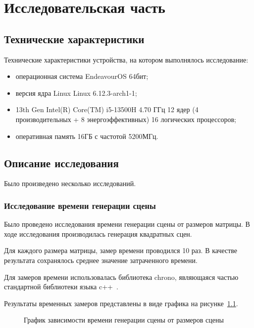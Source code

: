 \chapter{Исследовательская часть}

\section{Технические характеристики}

Технические характеристики устройства, на котором выполнялось исследование:
\begin{itemize}
  \item операционная система EndeavourOS 64бит;
  \item версия ядра Linux Linux 6.12.3-arch1-1;
  \item 13th Gen Intel(R) Core(TM) i5-13500H 4.70 ГГц 12 ядер (4
  производительных + 8 энергоэффективных) 16 логических процессоров;
  \item оперативная память 16ГБ с частотой 5200МГц.
\end{itemize}

\section{Описание исследования}

Было произведено несколько исследований.

\subsection*{Исследование времени генерации сцены}

Было проведено исследования времени генерации сцены от размеров матрицы. В ходе исследования производилась генерация квадратных сцен.

Для каждого размера матрицы, замер времени проводился 10 раз. В качестве результата сохранялось среднее значение затраченного времени.

Для замеров времени использовалась библиотека chrono, являющаяся частью стандартной библиотеки языка c++~\cite{cpp}.

Результаты временных замеров представлены в виде графика на рисунке~\ref{fig:qwfc_graph}.

\begin{figure}[h!]
  \centering
  
  \caption{График зависимости времени генерации сцены от размеров сцены}
  \label{fig:qwfc_graph}
\end{figure}

